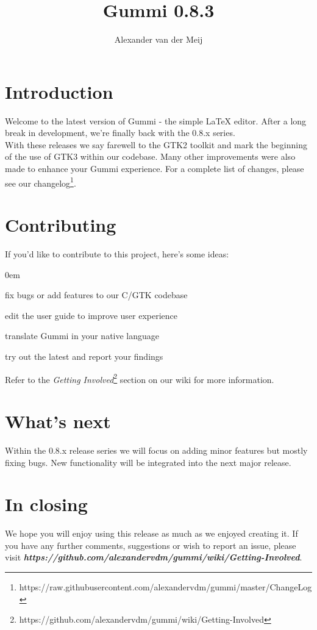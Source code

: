 \documentclass[11pt]{article}
\title{\textbf{Gummi 0.8.3}}
\author{Alexander van der Meij}
\date{}
\begin{document}
\maketitle
\thispagestyle{empty}

\section{Introduction}
Welcome to the latest version of Gummi - the simple {\LaTeX} editor. After a long break in development, we're finally back with the 0.8.x series.\\
With these releases we say farewell to the GTK2 toolkit and mark the beginning of the use of GTK3 within our codebase. Many other improvements were also made to enhance your Gummi experience. For a complete list of changes, please see our changelog\footnote{https://raw.githubusercontent.com/alexandervdm/gummi/master/ChangeLog}. 

\section{Contributing}
If you'd like to contribute to this project, here's some ideas:
\begin{description}
\addtolength{\itemindent}{0.80cm}
\itemsep0em 
\item[Development] fix bugs or add features to our C/GTK codebase
\item[Documentation] edit the user guide to improve user experience
\item[Localization] translate Gummi in your native language
\item[Testing] try out the latest and report your findings
\end{description}
Refer to the \emph{Getting Involved}\footnote{https://github.com/alexandervdm/gummi/wiki/Getting-Involved} section on our wiki for more information. 

\section{What's next}
Within the 0.8.x release series we will focus on adding minor features but mostly fixing bugs. New functionality will be integrated into the next major release. 

\section{In closing}
We hope you will enjoy using this release as much as we enjoyed creating it. If you have any further comments, suggestions or wish to report an issue, please visit \emph{\textbf{https://github.com/alexandervdm/gummi/wiki/Getting-Involved}}. 
\end{document}
